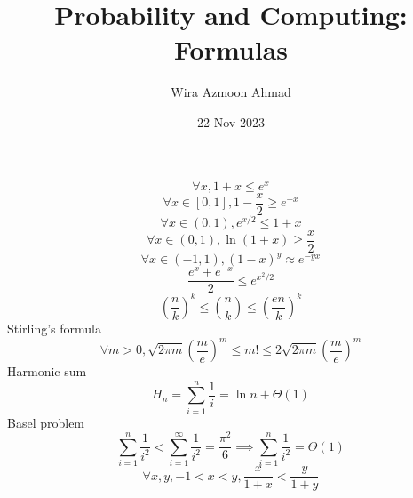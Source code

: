 \documentclass[11pt]{article} %
\title{Probability and Computing: \\Formulas}
\author{Wira Azmoon Ahmad}
\date{22 Nov 2023}
\begin{document}
%
\maketitle





\[\forall x, 1+x\leq e^x\]
\[\forall x\in[0,1], 1-\frac{x}{2}\geq e^{-x}\]
\[\forall x\in(0,1),e^{x/2}\leq 1+x\]
\[\forall x\in(0,1),\ln(1+x)\geq \frac{x}{2}\]
\[\forall x\in(-1,1), (1-x)^y \approx e^{-yx}\]
\[\frac{e^x + e^{-x}}{2} \leq e^{x^2/2}\]
\[\left(\frac{n}{k}\right)^k \leq \binom{n}{k} \leq \left(\frac{en}{k}\right)^k\]
Stirling's formula
\[\forall m>0, \sqrt{2\pi m}\left(\frac{m}{e}\right)^m \leq m! 
\leq 2\sqrt{2\pi m}\left(\frac{m}{e}\right)^m\]
Harmonic sum
\[H_n = \sum_{i=1}^n \frac{1}{i} = \ln n + \Theta(1)\]
Basel problem
\[\sum_{i=1}^n \frac{1}{i^2} < \sum_{i = 1}^\infty\frac{1}{i^2} = \frac{\pi^2}{6}
\implies\sum_{i=1}^n \frac{1}{i^2}=\Theta(1)\]
\[\forall x,y, -1<x<y, \frac{x}{1+x}<\frac{y}{1+y}\]
\end{document}

